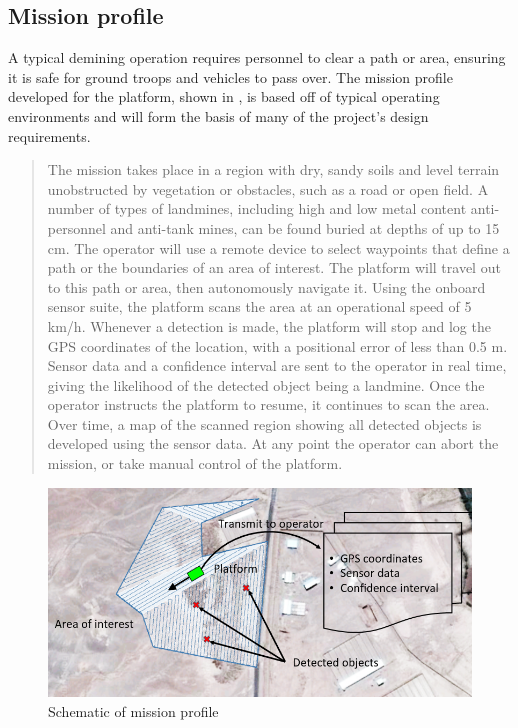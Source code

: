 \documentclass[main.tex]{subfiles}
\begin{document}


\subsection{Mission profile}
A typical demining operation requires personnel to clear a path or area, ensuring it is safe for ground troops and vehicles to pass over. The mission profile developed for the platform, shown in , is based off of typical operating environments and will form the basis of many of the project's design requirements.
\begin{quote}The mission takes place in a region with dry, sandy soils and level terrain unobstructed by vegetation or obstacles, such as a road or open field. A number of types of landmines, including high and low metal content anti-personnel and anti-tank mines, can be found buried at depths of up to 15 cm. The operator will use a remote device to select waypoints that define a path or the boundaries of an area of interest. The platform will travel out to this path or area, then autonomously navigate it. Using the onboard sensor suite, the platform scans the area at an operational speed of 5 km/h. Whenever a detection is made, the platform will stop and log the GPS coordinates of the location, with a positional error of less than 0.5 m. Sensor data and a confidence interval are sent to the operator in real time, giving the likelihood of the detected object being a landmine. Once the operator instructs the platform to resume, it continues to scan the area. Over time, a map of the scanned region showing all detected objects is developed using the sensor data. At any point the operator can abort the mission, or take manual control of the platform.
\end{quote}

\begin{figure}[ht]
\centering
\includegraphics[width=\textwidth]{1-Introduction/SoO.PNG}
\caption{Schematic of mission profile}
\end{figure}
\end{document}
